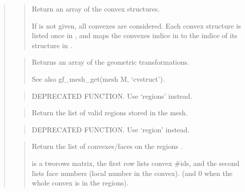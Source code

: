 \documentclass[a4paper,11pt,english]{sphinxmanual}
\begin{document}
\begin{quote}
\begin{quote}
Return an array of the convex structures.

If  is not given, all convexes are considered. Each convex
structure is listed once in , and  maps the convexes
indice in  to the indice of its structure in .
\end{quote}

\begin{quote}

Returns an array of the geometric transformations.

See also gf\_mesh\_get(mesh M, ‘cvstruct’).
\end{quote}

\begin{quote}

DEPRECATED FUNCTION. Use ‘regions’ instead.
\end{quote}

\begin{quote}

Return the list of valid regions stored in the mesh.
\end{quote}

\begin{quote}

DEPRECATED FUNCTION. Use ‘region’ instead.
\end{quote}

\begin{quote}

Return the list of convexes/faces on the regions .

 is a two\sphinxhyphen{}rows matrix, the first row lists convex \#ids,
and the second lists face numbers (local number in the convex).
(and 0 when the whole convex is in the
regions).
\end{quote}

\begin{quote}


\end{quote}
\end{quote}
\end{document}
